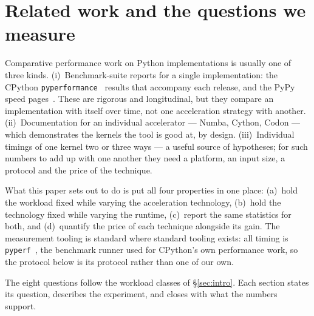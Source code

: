 \documentclass[10pt,a4paper]{article}
\newcommand{\code}[1]{\texttt{\small #1}}
\begin{document}
\section{Related work and the questions we measure}
\label{sec:related}

Comparative performance work on Python implementations is usually one of three kinds.
(i)~Benchmark-suite reports for a single implementation: the CPython \code{pyperformance}~\cite{pyperformance}
results that accompany each release, and the PyPy speed pages~\cite{pypyspeed}. These are rigorous and
longitudinal, but they compare an implementation with itself over time, not one acceleration
strategy with another. (ii)~Documentation for an individual accelerator --- Numba, Cython,
Codon --- which demonstrates the kernels the tool is good at, by design. (iii)~Individual
timings of one kernel two or three ways --- a useful source of hypotheses; for such numbers to
add up with one another they need a platform, an input size, a protocol and the price of the
technique.

What this paper sets out to do is put all four properties in one place: (a)~hold the workload
fixed while varying the acceleration technology, (b)~hold the technology fixed while varying
the runtime, (c)~report the same statistics for both, and (d)~quantify the price of each
technique alongside its gain. The measurement tooling is standard where standard tooling
exists: all timing is \code{pyperf}~\cite{pyperf}, the benchmark runner used for CPython's
own performance work, so the protocol below is its protocol rather than one of our own.

The eight questions follow the workload classes of \S\ref{sec:intro}. Each section states its
question, describes the experiment, and closes with what the numbers support.
\end{document}
